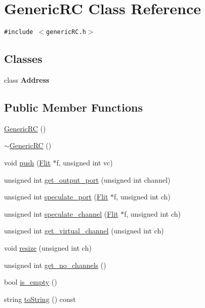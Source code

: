 \hypertarget{classGenericRC}{
\section{GenericRC Class Reference}
\label{classGenericRC}
}
{\tt \#include $<$genericRC.h$>$}

\subsection*{Classes}
\begin{CompactItemize}
\item 
class \textbf{Address}
\end{CompactItemize}
\subsection*{Public Member Functions}
\begin{CompactItemize}
\item 
\hyperlink{classGenericRC_92f9cd6b1dafc9eb0a3a1450448888fe}{GenericRC} ()
\item 
\hyperlink{classGenericRC_f63422fabc3b4393e060ea7ad68981e9}{$\sim$GenericRC} ()
\item 
void \hyperlink{classGenericRC_4698476460f0a811482905dbab564764}{push} (\hyperlink{classFlit}{Flit} $\ast$f, unsigned int vc)
\item 
unsigned int \hyperlink{classGenericRC_75ca57d2ed84543ef4083c2fe8e83644}{get\_\-output\_\-port} (unsigned int channel)
\item 
unsigned int \hyperlink{classGenericRC_23666c0b23e511d1f46917023fe26b66}{speculate\_\-port} (\hyperlink{classFlit}{Flit} $\ast$f, unsigned int ch)
\item 
unsigned int \hyperlink{classGenericRC_62380900287660d9e73a80f8da7800ab}{speculate\_\-channel} (\hyperlink{classFlit}{Flit} $\ast$f, unsigned int ch)
\item 
unsigned int \hyperlink{classGenericRC_c311af5e27b084df2e2463b74e207e3f}{get\_\-virtual\_\-channel} (unsigned int ch)
\item 
void \hyperlink{classGenericRC_611a7de2bb3f1eeea039185f706d0745}{resize} (unsigned int ch)
\item 
unsigned int \hyperlink{classGenericRC_6d8e1133e7eefd95a25a4dfe7d45491e}{get\_\-no\_\-channels} ()
\item 
bool \hyperlink{classGenericRC_5fc891e7753c5e06cd3599b11bab60a6}{is\_\-empty} ()
\item 
string \hyperlink{classGenericRC_214ef51af1dd900b41bb98b4826b5af4}{toString} () const 
\end{CompactItemize}
